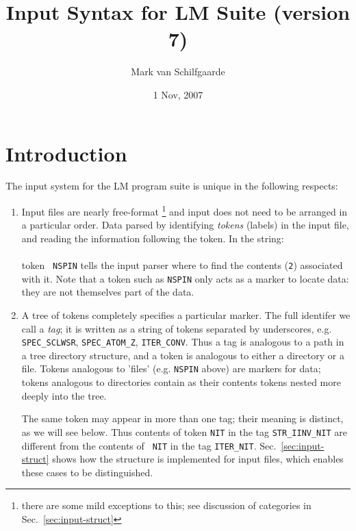 \documentclass{article}
\begin{document}
\title{\Large Input Syntax for LM Suite (version 7)}
\author{Mark van Schilfgaarde}
\date{1 Nov, 2007}
\maketitle

\section{\large Introduction}
\label{sec:intro}

The input system for the LM program suite is unique in the following
respects:
\begin{enumerate}

\item Input files are nearly free-format \footnote{there are some mild
      exceptions to this; see discussion of categories in
      Sec.~\ref{sec:input-struct}} and input does not need to be arranged
      in a particular order.  Data parsed by identifying \emph{tokens}
      (labels) in the input file, and reading the information following the
      token.  In the string:\\  \\ token {\tt
      NSPIN} tells the input parser where to find the contents ({\tt 2})
      associated with it.  Note that a token such as {\tt{}NSPIN} only acts
      as a marker to locate data: they are not themselves part of the data.

\item A tree of tokens completely specifies a particular marker.  The full
      identifer we call a \emph{tag}; it is written as a string of tokens
      separated by underscores, e.g. {\tt SPEC\_SCLWSR},
      {\tt{}SPEC\_ATOM\_Z}, {\tt ITER\_CONV}.  Thus a tag is analogous to
      a path in a tree directory structure, and a token is
      analogous to either a directory or a file.  Tokens analogous to
      'files' (e.g. {\tt{}NSPIN} above) are markers for data; tokens
      analogous to directories contain as their contents tokens nested more
      deeply into the tree.

      The same token may appear in more than one tag; their meaning is
      distinct, as we will see below.  Thus contents of token {\tt NIT} in
      the tag {\tt STR\_IINV\_NIT} are different from the contents of {\tt
      NIT} in the tag {\tt ITER\_NIT}.  Sec.~\ref{sec:input-struct} shows
      how the structure is implemented for input files, which enables these
      cases to be distinguished.


\end{enumerate}
\end{document}
